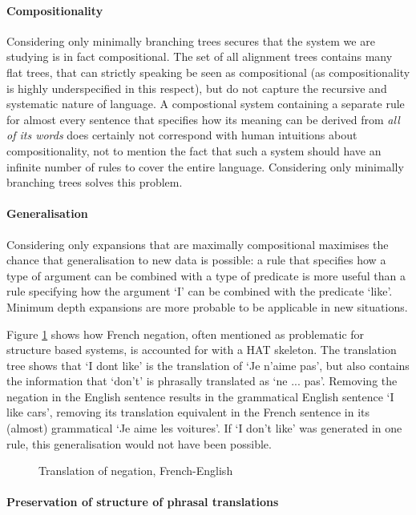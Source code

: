 \paragraph{Compositionality} Considering only minimally branching trees secures that the system we are studying is in fact compositional. The set of all alignment trees contains many flat trees, that can strictly speaking be seen as compositional (as compositionality is highly underspecified in this respect), but do not capture the recursive and systematic nature of language. A compostional system containing a separate rule for almost every sentence that specifies how its meaning can be derived from \textit{all of its words} does certainly not correspond with human intuitions about compositionality, not to mention the fact that such a system should have an infinite number of rules to cover the entire language. Considering only minimally branching trees solves this problem.

\paragraph{Generalisation} Considering only expansions that are maximally compositional maximises the chance that generalisation to new data is possible: a rule that specifies how a type of argument can be combined with a type of predicate is more useful than a rule specifying how the argument `I' can be combined with the predicate `like'. Minimum depth expansions are more probable to be applicable in new situations. 

Figure \ref{fig:nepas} shows how French negation, often mentioned as problematic for structure based systems, is accounted for with a HAT skeleton. The translation tree shows that `I dont like' is the translation of `Je n'aime pas', but also contains the information that `don't' is phrasally translated as `ne ... pas'. Removing the negation in the English sentence results in the grammatical English sentence `I like cars', removing its translation equivalent in the French sentence in its (almost) grammatical `Je aime les voitures'. If `I don't like' was generated in one rule, this generalisation would not have been possible.

\begin{figure}[!ht]
\centering

\caption{Translation of negation, French-English}\label{fig:nepas}
\end{figure} 

\paragraph{Preservation of structure of phrasal translations}

